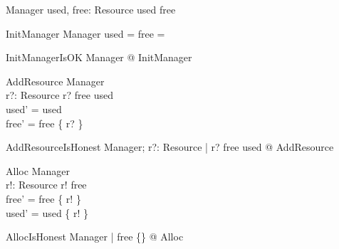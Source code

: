 \begin{zed}
  [Resource]
\end{zed}

\begin{schema}{Manager}
  used, free: \power Resource
\where
  used \dj free
\end{schema}

\begin{schema}{InitManager}
  Manager
\where
  used = free = \emptyset
\end{schema}

\begin{theorem}{InitManagerIsOK}
  \exists Manager @ InitManager
\end{theorem}

\begin{schema}{AddResource}
  \Delta Manager \\
  r?: Resource
\where
  r? \notin free \cup used \\
  used' = used \\
  free' = free \cup \{ r? \}
\end{schema}

\begin{theorem}{AddResourceIsHonest}
  \forall Manager; r?: Resource | r? \notin free \cup used @ \pre AddResource
\end{theorem}

\begin{schema}{Alloc}
  \Delta Manager \\
  r!: Resource
\where
  r! \in free \\
  free' = free \setminus \{ r! \} \\
  used' = used \cup \{ r! \}
\end{schema}

\begin{theorem}{AllocIsHonest}
  \forall Manager | free \neq \{\} @ \pre Alloc
\end{theorem}
